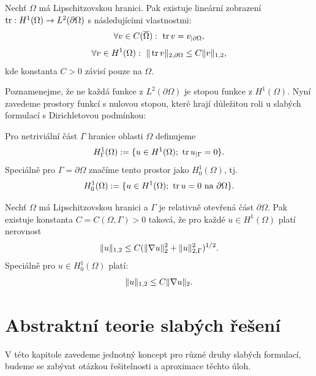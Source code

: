 \begin{veta}[o stopách]\label{th:trace}
Nechť $\Omega$ má Lipschitzovskou hranici. Pak existuje lineární zobrazení $\operatorname{tr}:H^1(\Omega)\rightarrow L^2(\partial\Omega)$ s následujícími vlastnostmi:
\[ \forall v\in C(\overline\Omega):~ \operatorname{tr} v = v_{|\partial\Omega}, \]
\[ \forall v\in H^1(\Omega):~\|\operatorname{tr} v\|_{2,\partial\Omega} \le C\|v\|_{1,2}, \]
kde konstanta $C>0$ závisí pouze na $\Omega$.
\end{veta}

Poznamenejme, že ne každá funkce z $L^2(\partial\Omega)$ je stopou funkce z $H^1(\Omega)$.
Nyní zavedeme prostory funkcí s nulovou stopou, které hrají důležitou roli u slabých formulací s Dirichletovou podmínkou:
\begin{df}
Pro netriviální část $\Gamma$ hranice oblasti $\Omega$ definujeme
\[ H^1_\Gamma(\Omega) := \{ u\in H^1(\Omega);~\operatorname{tr} u_{|\Gamma}=0 \}. \]
Speciálně pro $\Gamma=\partial\Omega$ značíme tento prostor jako $H^1_0(\Omega)$, tj.
\[ H^1_0(\Omega) := \{ u\in H^1(\Omega);~\operatorname{tr} u=0 \mbox{ na }\partial\Omega\}. \]
\end{df}


\begin{veta}\label{th:friedrichs}
Nechť $\Omega$ má Lipschitzovskou hranici a $\Gamma$ je relativně otevřená část $\partial\Omega$.
Pak existuje konstanta $C=C(\Omega,\Gamma)>0$ taková, že pro každé $u\in H^1(\Omega)$ platí nerovnost
\begin{equation} \label{eq:friedrichs_H1gamma}
\|u\|_{1,2} \le C(\|\nabla u\|_2^2 + \|u\|_{2,\Gamma}^2)^{1/2}.
\end{equation}
Speciálně pro $u\in H^1_0(\Omega)$ platí:
\begin{equation} \label{eq:friedrichs_H10}
\|u\|_{1,2} \le C\|\nabla u\|_2.
\end{equation}
\end{veta}







\section{Abstraktní teorie slabých řešení}

V této kapitole zavedeme jednotný koncept pro různé druhy slabých formulací, budeme se zabývat otázkou řešitelnosti a aproximace těchto úloh.

